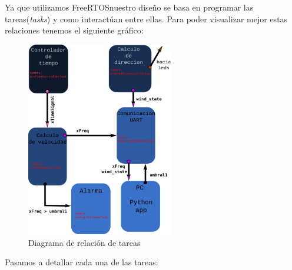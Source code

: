 \documentclass[10pt]{article}
\begin{document}
Ya que utilizamos FreeRTOS\texttrademark nuestro diseño se basa en programar las tareas(\textit{tasks}) y como interactúan entre ellas. Para poder visualizar mejor estas relaciones tenemos el siguiente gráfico:
\begin{figure}[H]
   \centering
   \includegraphics[width=0.57\textwidth]{./Images/Tasks.png}
   \caption{Diagrama de relación de tareas}\label{fig:Task}
\end{figure}
Pasamos a detallar cada una de las tareas:
\end{document}

